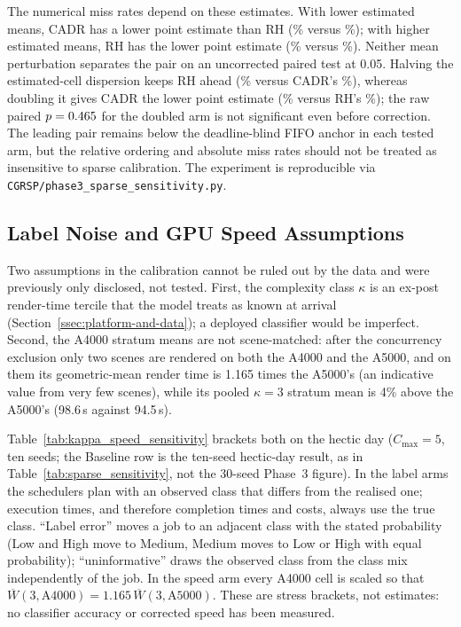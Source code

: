 {The numerical miss rates depend on these estimates. With lower estimated means, CADR has a lower point estimate than RH (\SparseMeanLowCADRMiss\% versus \SparseMeanLowRHMiss\%); with higher estimated means, RH has the lower point estimate (\SparseMeanHighRHMiss\% versus \SparseMeanHighCADRMiss\%). Neither mean perturbation separates the pair on an uncorrected paired test at 0.05. Halving the estimated-cell dispersion keeps RH ahead (\SparseSigmaLowRHMiss\% versus CADR's \SparseSigmaLowCADRMiss\%), whereas doubling it gives CADR the lower point estimate (\SparseSigmaHighCADRMiss\% versus RH's \SparseSigmaHighRHMiss\%); the raw paired $p=0.465$ for the doubled arm is not significant even before correction. The leading pair remains below the deadline-blind FIFO anchor in each tested arm, but the relative ordering and absolute miss rates should not be treated as insensitive to sparse calibration. The experiment is reproducible via \texttt{CGRSP/phase3\_sparse\_sensitivity.py}.

\subsection{Label Noise and GPU Speed Assumptions}
\label{ssec:label-noise-and-gpu-speed-assumptions}

Two assumptions in the calibration cannot be ruled out by the data and were previously only disclosed, not tested. First, the complexity class $\kappa$ is an ex-post render-time tercile that the model treats as known at arrival (Section~\ref{ssec:platform-and-data}); a deployed classifier would be imperfect. Second, the A4000 stratum means are not scene-matched: after the concurrency exclusion only two scenes are rendered on both the A4000 and the A5000, and on them its geometric-mean render time is 1.165 times the A5000's (an indicative value from very few scenes), while its pooled $\kappa=3$ stratum mean is 4\% above the A5000's (98.6\,s against 94.5\,s).

Table~\ref{tab:kappa_speed_sensitivity} brackets both on the hectic day ($C_{\max}=5$, ten seeds; the Baseline row is the ten-seed hectic-day result, as in Table~\ref{tab:sparse_sensitivity}, not the 30-seed Phase~3 figure). In the label arms the schedulers plan with an observed class that differs from the realised one; execution times, and therefore completion times and costs, always use the true class. ``Label error'' moves a job to an adjacent class with the stated probability (Low and High move to Medium, Medium moves to Low or High with equal probability); ``uninformative'' draws the observed class from the class mix independently of the job. In the speed arm every A4000 cell is scaled so that $\overline{W}(3,\text{A4000})=1.165\,\overline{W}(3,\text{A5000})$. These are stress brackets, not estimates: no classifier accuracy or corrected speed has been measured.

}
